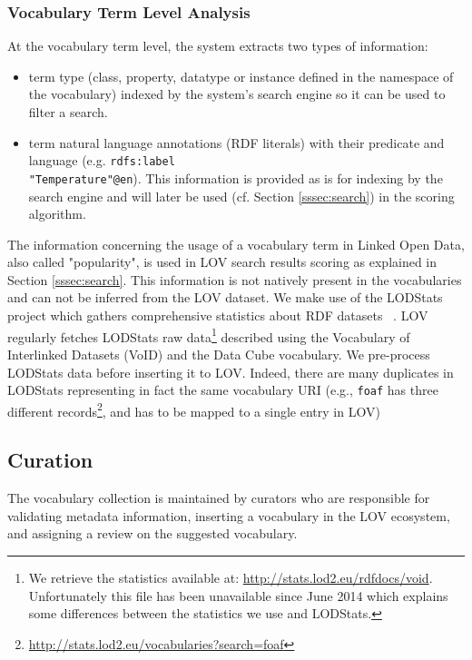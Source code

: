\documentclass{iosart2c}
\begin{document}
\subsubsection{Vocabulary Term Level Analysis}
At the vocabulary term level, the system extracts two types of information:
\begin{itemize}
\item term type (class, property, datatype or instance defined in the namespace of the vocabulary) indexed by the system's search engine so it can be used to filter a search.
\item term natural language annotations (RDF literals) with their predicate and language (e.g. {\small\texttt{rdfs:label}}\\ {\small\texttt{"Temperature"@en}}). This information is provided as is for indexing by the search engine and will later be used (cf. Section \ref{sssec:search}) in the scoring algorithm.
\end{itemize}

The information concerning the usage  of a vocabulary term in Linked Open Data, also called "popularity", is used in LOV search results scoring as explained in Section \ref{sssec:search}. This information is not natively present in the vocabularies and can not be inferred from the LOV dataset. We make use of the LODStats project which gathers comprehensive statistics about RDF datasets ~\cite{demter-2012-ekaw}. LOV regularly fetches LODStats raw data\footnote{We retrieve the statistics available at: \url{http://stats.lod2.eu/rdfdocs/void}. Unfortunately this file has been unavailable since June 2014 which explains some differences between the statistics we use and LODStats.} described using the Vocabulary of Interlinked Datasets (VoID) \cite{void2009} and the Data Cube vocabulary. We pre-process LODStats data before inserting it to LOV. Indeed, there are many duplicates in LODStats representing in fact the same vocabulary URI (e.g., \texttt{foaf} has three different records\footnote{\url{http://stats.lod2.eu/vocabularies?search=foaf}}, and has to be mapped to a single entry in LOV)


\subsection{Curation}
The vocabulary collection is maintained by curators who are responsible for validating metadata information, inserting a vocabulary in the LOV ecosystem, and assigning a review on the suggested vocabulary. 
\end{document}
